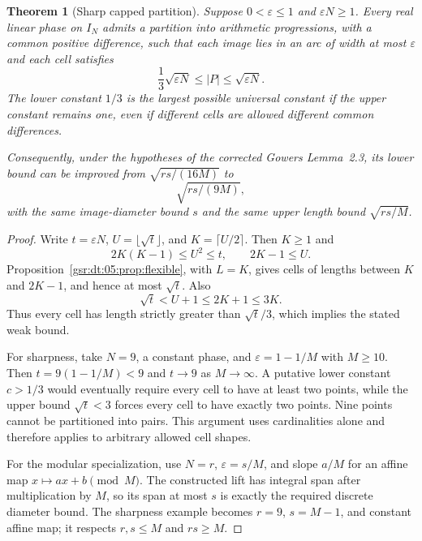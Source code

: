 \documentclass[11pt,letterpaper]{article}
\numberwithin{equation}{section}
\newtheorem{theorem}{Theorem}[section]
\theoremstyle{definition}
\theoremstyle{remark}
\newcommand{\1}{\mathbf 1}
\newcommand{\eps}{\varepsilon}
\begin{document}
\begin{theorem}[Sharp capped partition]
\label{gsr:dt:05:thm:sharp-capped}
Suppose $0<\eps\leq1$ and $\eps N\geq1$. Every real linear phase on $I_N$ admits a partition into arithmetic progressions, with a common positive difference, such that each image lies in an arc of width at most $\eps$ and each cell satisfies
\begin{equation}
 \frac13\sqrt{\eps N}\leq |P|\leq\sqrt{\eps N}.
 \label{gsr:dt:05:eq:sharp-capped}
\end{equation}
The lower constant $1/3$ is the largest possible universal constant if the upper constant remains one, even if different cells are allowed different common differences.

Consequently, under the hypotheses of the corrected Gowers Lemma~2.3, its lower bound can be improved from $\sqrt{rs/(16M)}$ to
\begin{equation}
 \sqrt{rs/(9M)},
 \label{gsr:dt:05:eq:modular-improved}
\end{equation}
with the same image-diameter bound $s$ and the same upper length bound $\sqrt{rs/M}$.
\end{theorem}
\begin{proof}
Write $t=\eps N$, $U=\lfloor\sqrt t\rfloor$, and $K=\lceil U/2\rceil$. Then $K\geq1$ and
\[
 2K(K-1)\leq U^2\leq t,\qquad 2K-1\leq U.
\]
Proposition~\ref{gsr:dt:05:prop:flexible}, with $L=K$, gives cells of lengths between $K$ and $2K-1$, and hence at most $\sqrt t$. Also
\[
 \sqrt t<U+1\leq2K+1\leq3K.
\]
Thus every cell has length strictly greater than $\sqrt t/3$, which implies the stated weak bound.

For sharpness, take $N=9$, a constant phase, and $\eps=1-1/M$ with $M\geq10$. Then $t=9(1-1/M)<9$ and $t\to9$ as $M\to\infty$. A putative lower constant $c>1/3$ would eventually require every cell to have at least two points, while the upper bound $\sqrt t<3$ forces every cell to have exactly two points. Nine points cannot be partitioned into pairs. This argument uses cardinalities alone and therefore applies to arbitrary allowed cell shapes.

For the modular specialization, use $N=r$, $\eps=s/M$, and slope $a/M$ for an affine map $x\mapsto ax+b\pmod M$. The constructed lift has integral span after multiplication by $M$, so its span at most $s$ is exactly the required discrete diameter bound. The sharpness example becomes $r=9$, $s=M-1$, and constant affine map; it respects $r,s\leq M$ and $rs\geq M$.
\end{proof}
\end{document}
